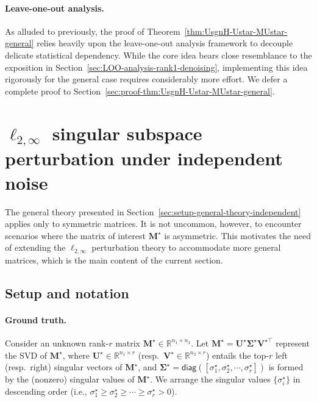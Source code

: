 \paragraph{Leave-one-out analysis.}
As alluded to previously, the proof of Theorem~\ref{thm:UsgnH-Ustar-MUstar-general} relies heavily upon the leave-one-out analysis framework to decouple delicate statistical dependency. While the core idea bears close resemblance to the exposition in Section~\ref{sec:LOO-analysis-rank1-denoising}, implementing this idea rigorously for the general case requires considerably more effort. We defer a complete proof to Section~\ref{sec:proof-thm:UsgnH-Ustar-MUstar-general}.





\section{$\ell_{2,\infty}$ singular subspace perturbation under independent noise}
\label{sec:general-L2inf-SVD-perturbation}

The general theory presented in Section~\ref{sec:setup-general-theory-independent} applies only to symmetric matrices. It is not uncommon, however, to encounter scenarios where the matrix of interest $\bm{M}^{\star}$ is  asymmetric.
This motivates the need of extending the $\ell_{2,\infty}$ perturbation theory to accommodate more general matrices, which is the main content of the current section.



\subsection{Setup and notation}\label{sec:general-theory-setup-asymm}
\paragraph{Ground truth.}

Consider an unknown rank-$r$ matrix $\bm{M}^{\star}\in\mathbb{R}^{n_{1}\times n_{2}}$. Let
 $\bm{M}^{\star}=\bm{U}^{\star}\bm{\Sigma}^{\star}\bm{V}^{\star\top}$
represent the SVD of $\bm{M}^{\star}$,
where $\bm{U}^{\star}\in\mathbb{R}^{n_{1}\times r}$ (resp.~$\bm{V}^{\star}\in\mathbb{R}^{n_{2}\times r}$)
entails the top-$r$ left (resp.~right) singular vectors of $\bm{M}^{\star}$,
and $\bm{\Sigma}^{\star}=\mathsf{diag}([\sigma_{1}^{\star},\sigma_{2}^{\star},\cdots,\sigma_{r}^{\star}])$
is formed by the (nonzero) singular values of $\bm{M}^{\star}$. We  arrange the singular values $\{\sigma_i^{\star}\}$ in descending order (i.e., $\sigma_{1}^{\star}\geq \sigma_{2}^{\star} \geq \cdots \geq \sigma_{r}^{\star} > 0$). 
%
%

